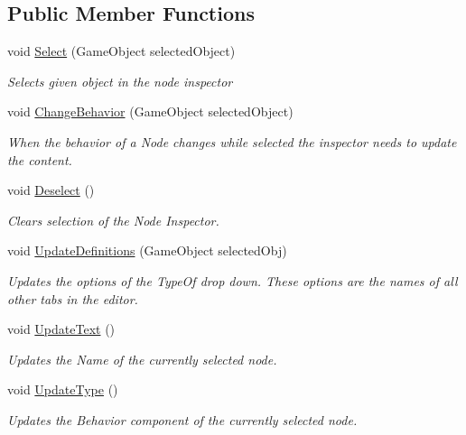 \subsection*{Public Member Functions}
\begin{DoxyCompactItemize}
\item 
void \hyperlink{class_node_inspector_af14ce741da70a5d25865c72b6dc9291b}{Select} (Game\+Object selected\+Object)
\begin{DoxyCompactList}\small\item\em Selects given object in the node inspector \end{DoxyCompactList}\item 
void \hyperlink{class_node_inspector_a622010fcd39b4bee19087e238b9574d6}{Change\+Behavior} (Game\+Object selected\+Object)
\begin{DoxyCompactList}\small\item\em When the behavior of a Node changes while selected the inspector needs to update the content. \end{DoxyCompactList}\item 
void \hyperlink{class_node_inspector_a553862e69d98c5b5528871e1e3a18ad1}{Deselect} ()
\begin{DoxyCompactList}\small\item\em Clears selection of the Node Inspector. \end{DoxyCompactList}\item 
void \hyperlink{class_node_inspector_a652635a29e79966c2819eb20cc8bedc1}{Update\+Definitions} (Game\+Object selected\+Obj)
\begin{DoxyCompactList}\small\item\em Updates the options of the Type\+Of drop down. These options are the names of all other tabs in the editor. \end{DoxyCompactList}\item 
void \hyperlink{class_node_inspector_a7742d3d6c097ee5c2bdaea18741da3fe}{Update\+Text} ()
\begin{DoxyCompactList}\small\item\em Updates the Name of the currently selected node. \end{DoxyCompactList}\item 
void \hyperlink{class_node_inspector_a8e1c3d87fc6a3dc3addb0cf4eddfd7a6}{Update\+Type} ()
\begin{DoxyCompactList}\small\item\em Updates the Behavior component of the currently selected node. \end{DoxyCompactList}\item 

\end{DoxyCompactItemize}
